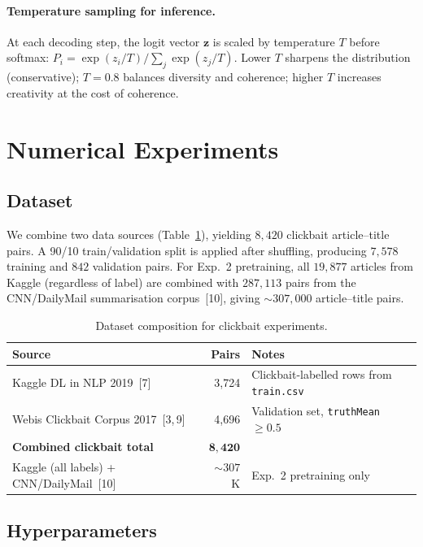 \documentclass{article}
\begin{document}
\paragraph{Temperature sampling for inference.}
At each decoding step, the logit vector $\mathbf{z}$ is scaled by temperature $T$ before softmax: $P_i = \exp(z_i / T) / \sum_j \exp(z_j / T)$.
Lower $T$ sharpens the distribution (conservative); $T{=}0.8$ balances diversity and coherence; higher $T$ increases creativity at the cost of coherence.


\section{Numerical Experiments}

\subsection{Dataset}

We combine two data sources (Table~\ref{tab:dataset}), yielding $8{,}420$ clickbait article--title pairs.
A 90/10 train/validation split is applied after shuffling, producing $7{,}578$ training and $842$ validation pairs.
For Exp.~2 pretraining, all $19{,}877$ articles from Kaggle (regardless of label) are combined with $287{,}113$ pairs from the CNN/DailyMail summarisation corpus~[10], giving ${\sim}307{,}000$ article--title pairs.

\begin{table}[ht]
  \caption{Dataset composition for clickbait experiments.}
  \label{tab:dataset}
  \centering
  \small
  \begin{tabular}{lrl}
    \toprule
    Source & Pairs & Notes \\
    \midrule
    Kaggle DL in NLP 2019~[7] & 3,724 & Clickbait-labelled rows from \texttt{train.csv} \\
    Webis Clickbait Corpus 2017~[3,\,9] & 4,696 & Validation set, \texttt{truthMean} $\geq 0.5$ \\
    \midrule
    \textbf{Combined clickbait total} & $\mathbf{8{,}420}$ & \\
    \midrule
    Kaggle (all labels) + CNN/DailyMail~[10] & ${\sim}307$K & Exp.~2 pretraining only \\
    \bottomrule
  \end{tabular}
\end{table}

\subsection{Hyperparameters}
\end{document}
